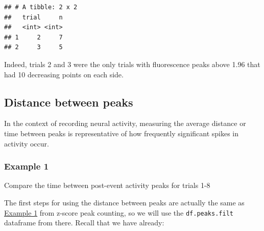\documentclass[
]{book}
\newenvironment{Shaded}{\begin{snugshade}}{\end{snugshade}}
\newcommand{\CommentTok}[1]{\textcolor[rgb]{0.56,0.35,0.01}{\textit{#1}}}
\newcommand{\FloatTok}[1]{\textcolor[rgb]{0.00,0.00,0.81}{#1}}
\newcommand{\KeywordTok}[1]{\textcolor[rgb]{0.13,0.29,0.53}{\textbf{#1}}}
\newcommand{\NormalTok}[1]{#1}
\newcommand{\OperatorTok}[1]{\textcolor[rgb]{0.81,0.36,0.00}{\textbf{#1}}}
\newcommand{\StringTok}[1]{\textcolor[rgb]{0.31,0.60,0.02}{#1}}
\begin{document}
\begin{Shaded}
\end{Shaded}

\begin{verbatim}
## # A tibble: 2 x 2
##   trial     n
##   <int> <int>
## 1     2     7
## 2     3     5
\end{verbatim}

Indeed, trials 2 and 3 were the only trials with fluorescence peaks above 1.96 that had 10 decreasing points on each side.

\hypertarget{analysis-app-peakdist}{%
\subsection{Distance between peaks}\label{analysis-app-peakdist}}

In the context of recording neural activity, measuring the average distance or time between peaks is representative of how frequently significant spikes in activity occur.

\hypertarget{analysis-app-peakdist-ex1}{%
\subsubsection{Example 1}\label{analysis-app-peakdist-ex1}}

Compare the time between post-event activity peaks for trials 1-8

The first steps for using the distance between peaks are actually the same as \protect\hyperlink{analysis-app-numpeaks-ex1}{Example 1} from z-score peak counting, so we will use the \texttt{df.peaks.filt} dataframe from there. Recall that we have already:
\end{document}
